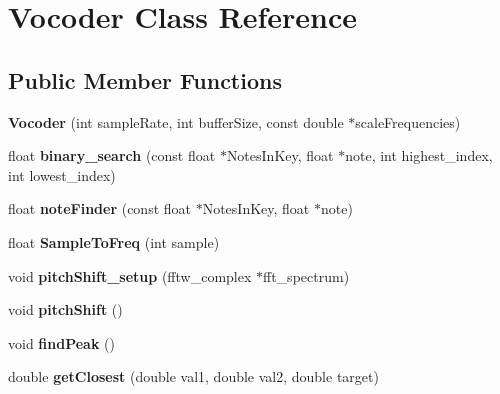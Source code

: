 \hypertarget{classVocoder}{\section{Vocoder Class Reference}
\label{classVocoder}
}
\subsection*{Public Member Functions}
\begin{DoxyCompactItemize}
\item 
\hypertarget{classVocoder_a3b1ed9bc5de7892f86bd2673ce72fd6e}{{\bfseries Vocoder} (int sample\-Rate, int buffer\-Size, const double $\ast$scale\-Frequencies)}\label{classVocoder_a3b1ed9bc5de7892f86bd2673ce72fd6e}

\item 
\hypertarget{classVocoder_a19c3f81b8451356f34601b6354e6d53e}{float {\bfseries binary\-\_\-search} (const float $\ast$Notes\-In\-Key, float $\ast$note, int highest\-\_\-index, int lowest\-\_\-index)}\label{classVocoder_a19c3f81b8451356f34601b6354e6d53e}

\item 
\hypertarget{classVocoder_a52ea6ca3fa19f44bdbbacf07e0e72064}{float {\bfseries note\-Finder} (const float $\ast$Notes\-In\-Key, float $\ast$note)}\label{classVocoder_a52ea6ca3fa19f44bdbbacf07e0e72064}

\item 
\hypertarget{classVocoder_a6ac34c186396037e8546fd03b5a0b51a}{float {\bfseries Sample\-To\-Freq} (int sample)}\label{classVocoder_a6ac34c186396037e8546fd03b5a0b51a}

\item 
\hypertarget{classVocoder_a205b461f0bf7c3b1ffb0b8a89ccd5e72}{void {\bfseries pitch\-Shift\-\_\-setup} (fftw\-\_\-complex $\ast$fft\-\_\-spectrum)}\label{classVocoder_a205b461f0bf7c3b1ffb0b8a89ccd5e72}

\item 
\hypertarget{classVocoder_a31c2f03502edb92a86ce799fbf4957f6}{void {\bfseries pitch\-Shift} ()}\label{classVocoder_a31c2f03502edb92a86ce799fbf4957f6}

\item 
\hypertarget{classVocoder_ad7e75d0c54cb9d2b1eb8f077050a6f81}{void {\bfseries find\-Peak} ()}\label{classVocoder_ad7e75d0c54cb9d2b1eb8f077050a6f81}

\item 
\hypertarget{classVocoder_ab736b53577e9ba92259a5c4074a0bf00}{double {\bfseries get\-Closest} (double val1, double val2, double target)}\label{classVocoder_ab736b53577e9ba92259a5c4074a0bf00}


\end{DoxyCompactItemize}
